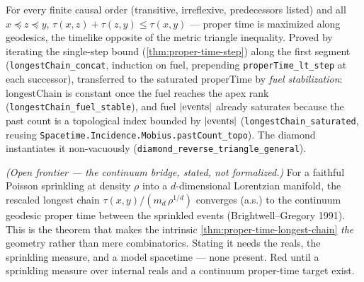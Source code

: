 \begin{theorem}\label{thm:reverse-triangle-general}\leanok{}
For every finite causal order (transitive, irreflexive, predecessors listed) and all
$x\preceq z\preceq y$, $\tau(x,z)+\tau(z,y)\le\tau(x,y)$ --- proper time is maximized along geodesics,
the timelike opposite of the metric triangle inequality. Proved by iterating the single-step bound
(\cref{thm:proper-time-step}) along the first segment (\texttt{longestChain\_concat}, induction on
fuel, prepending \texttt{properTime\_lt\_step} at each successor), transferred to the saturated
$\mathrm{properTime}$ by \emph{fuel stabilization}: $\mathrm{longestChain}$ is constant once the fuel
reaches the apex rank (\texttt{longestChain\_fuel\_stable}), and fuel $|{\rm events}|$ already
saturates because the past count is a topological index bounded by $|{\rm events}|$
(\texttt{longestChain\_saturated}, reusing \texttt{Spacetime.Incidence.Mobius.pastCount\_topo}). The diamond
instantiates it non-vacuously (\texttt{diamond\_reverse\_triangle\_general}).
\end{theorem}

\begin{theorem}\label{thm:brightwell-gregory-continuum}\notready{}
\emph{(Open frontier --- the continuum bridge, stated, not formalized.)} For a faithful Poisson
sprinkling at density $\rho$ into a $d$-dimensional Lorentzian manifold, the rescaled longest chain
$\tau(x,y)/(m_d\,\rho^{1/d})$ converges (a.s.) to the continuum geodesic proper time between the
sprinkled events (Brightwell--Gregory 1991). This is the theorem that makes the intrinsic
\cref{thm:proper-time-longest-chain} \emph{the} geometry rather than mere combinatorics. Stating it
needs the reals, the sprinkling measure, and a model spacetime --- none present. Red until a sprinkling
measure over internal reals and a continuum proper-time target exist.
\end{theorem}
